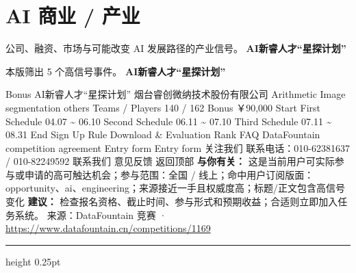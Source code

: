 \documentclass[10.5pt]{ctexart}
\begin{document}
\section*{AI 商业 / 产业}
{\color{ormuted} 公司、融资、市场与可能改变 AI 发展路径的产业信号。}
\vspace{2mm}
{\LARGE\bfseries AI新睿人才“星探计划”}\par
\vspace{1mm}
{\color{ormuted} 本版筛出 5 个高信号事件。}
\vspace{3mm}
{\Large\bfseries AI新睿人才“星探计划”}\par
Bonus AI新睿人才“星探计划” 烟台睿创微纳技术股份有限公司 Arithmetic Image segmentation others Teams / Players 140 / 162 Bonus ￥90,000 Start First Schedule 04.07 \textasciitilde{} 06.10 Second Schedule 06.11 \textasciitilde{} 07.10 Third Schedule 07.11 \textasciitilde{} 08.31 End Sign Up Rule Download \& Evaluation Rank FAQ DataFountain competition agreement Entry form Entry form 关注我们 联系电话：010-62381637 / 010-82249592 联系我们 意见反馈 返回顶部
\textbf{与你有关：} 这是当前用户可实际参与或申请的高可触达机会；参与范围：全国 / 线上；命中用户订阅版面：opportunity、ai、engineering；来源接近一手且权威度高；标题/正文包含高信号变化
\textbf{建议：} 检查报名资格、截止时间、参与形式和预期收益；合适则立即加入任务系统。
{\footnotesize\color{ormuted} 来源：DataFountain 竞赛 · \url{https://www.datafountain.cn/competitions/1169}}
\vspace{4mm}
\hrule height 0.25pt
\vspace{3mm}
\end{document}
